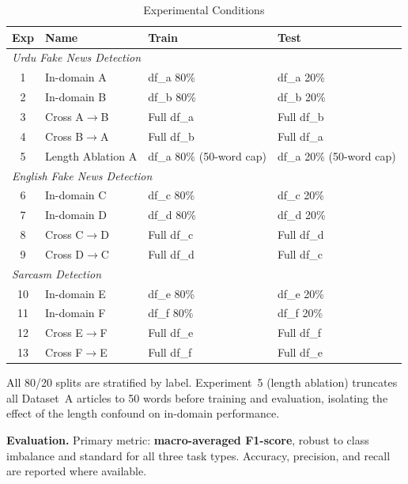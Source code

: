 \documentclass[conference]{IEEEtran}
\begin{document}
\begin{table}[!htb]
\centering
\caption{Experimental Conditions}
\label{tab:experiments}
\setlength{\tabcolsep}{4pt}
\begin{tabular}{clll}
\toprule
\textbf{Exp} & \textbf{Name} & \textbf{Train} & \textbf{Test} \\
\midrule
\multicolumn{4}{l}{\textit{Urdu Fake News Detection}} \\
1  & In-domain A            & df\_a 80\%          & df\_a 20\%      \\
2  & In-domain B            & df\_b 80\%          & df\_b 20\%      \\
3  & Cross A$\to$B          & Full df\_a          & Full df\_b      \\
4  & Cross B$\to$A          & Full df\_b          & Full df\_a      \\
5  & Length Ablation A      & df\_a 80\% (50-word cap) & df\_a 20\% (50-word cap) \\
\midrule
\multicolumn{4}{l}{\textit{English Fake News Detection}} \\
6  & In-domain C            & df\_c 80\%          & df\_c 20\%      \\
7  & In-domain D            & df\_d 80\%          & df\_d 20\%      \\
8  & Cross C$\to$D          & Full df\_c          & Full df\_d      \\
9  & Cross D$\to$C          & Full df\_d          & Full df\_c      \\
\midrule
\multicolumn{4}{l}{\textit{Sarcasm Detection}} \\
10 & In-domain E            & df\_e 80\%          & df\_e 20\%      \\
11 & In-domain F            & df\_f 80\%          & df\_f 20\%      \\
12 & Cross E$\to$F          & Full df\_e          & Full df\_f      \\
13 & Cross F$\to$E          & Full df\_f          & Full df\_e      \\
\bottomrule
\end{tabular}
\end{table}

All 80/20 splits are stratified by label. Experiment~5 (length
ablation) truncates all Dataset~A articles to 50 words before
training and evaluation, isolating the effect of the length confound
on in-domain performance.

\textbf{Evaluation.} Primary metric: \textbf{macro-averaged F1-score},
robust to class imbalance and standard for all three task types.
Accuracy, precision, and recall are reported where available.
\end{document}
